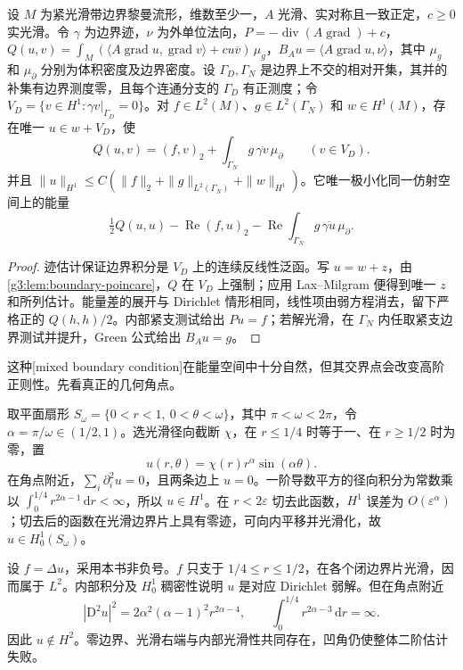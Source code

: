 \begin{theorem}\label{g3:thm:weak-mixed-boundary}
	设 \(M\) 为紧光滑带边界黎曼流形，维数至少一，\(A\) 光滑、实对称且一致正定，\(c\ge0\) 实光滑。令 \(\gamma\) 为边界迹，\(\nu\) 为外单位法向，\(P=-\operatorname{div}(A\operatorname{grad})+c\)，\(Q(u,v)=\int_M(\langle A\operatorname{grad}u,\operatorname{grad}v\rangle+cu\overline v)\,\mu_g\)，\(B_Au=\langle A\operatorname{grad}u,\nu\rangle\)，其中 \(\mu_g\) 和 \(\mu_\partial\) 分别为体积密度及边界密度。设 \(\Gamma_D,\Gamma_N\) 是边界上不交的相对开集，其并的补集有边界测度零，且每个连通分支的 \(\Gamma_D\) 有正测度；令 \(V_D=\{v\in H^1:\gamma v|_{\Gamma_D}=0\}\)。对 \(f\in L^2(M)\)、\(g\in L^2(\Gamma_N)\) 和 \(w\in H^1(M)\)，存在唯一 \(u\in w+V_D\)，使
	\[
		Q(u,v)=(f,v)_2+\int_{\Gamma_N}g\,\overline{\gamma v}\,\mu_{\partial}
		\qquad(v\in V_D).
	\]
	并且 \(\|u\|_{H^1}\le C(\|f\|_2+\|g\|_{L^2(\Gamma_N)}+\|w\|_{H^1})\)。它唯一极小化同一仿射空间上的能量
	\[
		\tfrac12Q(u,u)-\operatorname{Re}(f,u)_2
		-\operatorname{Re}\int_{\Gamma_N}g\,\overline{\gamma u}\,\mu_{\partial}.
	\]
\end{theorem}
\begin{proof}
	迹估计保证边界积分是 \(V_D\) 上的连续反线性泛函。写 \(u=w+z\)，由\cref{g3:lem:boundary-poincare}，\(Q\) 在 \(V_D\) 上强制；应用 Lax--Milgram 便得到唯一 \(z\) 和所列估计。能量差的展开与 Dirichlet 情形相同，线性项由弱方程消去，留下严格正的 \(Q(h,h)/2\)。内部紧支测试给出 \(Pu=f\)；若解光滑，在 \(\Gamma_N\) 内任取紧支边界测试并提升，Green 公式给出 \(B_Au=g\)。
\end{proof}

这种[mixed boundary condition]在能量空间中十分自然，但其交界点会改变高阶正则性。先看真正的几何角点。

\begin{example}\label{g3:exm:reentrant-corner-singularity}
	取平面扇形 \(S_\omega=\{0<r<1,\ 0<\theta<\omega\}\)，其中 \(\pi<\omega<2\pi\)，令 \(\alpha=\pi/\omega\in(1/2,1)\)。选光滑径向截断 \(\chi\)，在 \(r\le1/4\) 时等于一、在 \(r\ge1/2\) 时为零，置
	\[
		u(r,\theta)=\chi(r)r^\alpha\sin(\alpha\theta).
	\]
	在角点附近，\(\sum_i\partial_i^2u=0\)，且两条边上 \(u=0\)。一阶导数平方的径向积分为常数乘以 \(\int_0^{1/4}r^{2\alpha-1}\,\mathrm dr<\infty\)，所以 \(u\in H^1\)。在 \(r<2\varepsilon\) 切去此函数，\(H^1\) 误差为 \(O(\varepsilon^\alpha)\)；切去后的函数在光滑边界片上具有零迹，可向内平移并光滑化，故 \(u\in H_0^1(S_\omega)\)。

	设 \(f=\Delta u\)，采用本书非负号。\(f\) 只支于 \(1/4\le r\le1/2\)，在各个闭边界片光滑，因而属于 \(L^2\)。内部积分及 \(H_0^1\) 稠密性说明 \(u\) 是对应 Dirichlet 弱解。但在角点附近
	\[
		|\mathrm D^2u|^2=2\alpha^2(\alpha-1)^2r^{2\alpha-4},\qquad
		\int_0^{1/4}r^{2\alpha-3}\,\mathrm dr=\infty.
	\]
	因此 \(u\notin H^2\)。零边界、光滑右端与内部光滑性共同存在，凹角仍使整体二阶估计失败。
\end{example}

